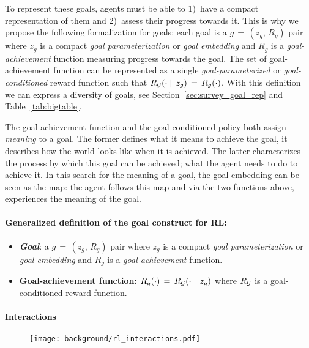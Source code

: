 To represent these goals, \rl agents must be able to 1)~have a compact representation of them and 2)~assess their progress towards it. This is why we propose the following formalization for \rl goals: each goal is a $g\,=\,(z_g,\,R_g)$ pair where $z_g$ is a compact \textit{goal parameterization} or \textit{goal embedding} and $R_g$ is a \textit{goal-achievement} function measuring progress towards the goal. The set of goal-achievement function can be represented as a single \textit{goal-parameterized} or \textit{goal-conditioned} reward function such that $R_{\mathcal{G}}(\cdot\mid\,z_g)\,=\,R_g(\cdot)$. With this definition we can express a diversity of goals, see Section~\ref{sec:survey_goal_rep} and Table~\ref{tab:bigtable}.

The goal-achievement function and the goal-conditioned policy both assign \textit{meaning} to a goal. The former defines what it means to achieve the goal, it describes how the world looks like when it is achieved. The latter characterizes the process by which this goal can be achieved; what the agent needs to do to achieve it. In this search for the meaning of a goal, the goal embedding can be seen as the map: the agent follows this map and via the two functions above, experiences the meaning of the goal.


\begin{tcolorbox}
\small
\paragraph{Generalized definition of the goal construct for RL:}
\begin{itemize}
    \item \textbf{\textit{Goal}}: a $g\,=\,(z_g,\,R_g)$ pair where $z_g$ is a compact \textit{goal parameterization} or \textit{goal embedding} and $R_g$ is a \textit{goal-achievement} function.
    \item \textbf{Goal-achievement function: $R_g(\cdot)\,=\,R_{\mathcal{G}}(\cdot\mid\,z_g)$} where $R_{\mathcal{G}}$ is a goal-conditioned reward function.
\end{itemize}
\end{tcolorbox}
\paragraph{Interactions}

\begin{figure}[!h]
\centering
\texttt{[image: background/rl\_interactions.pdf]}	
\caption{}
\label{fig:rl_interacvtions}
\end{figure}


